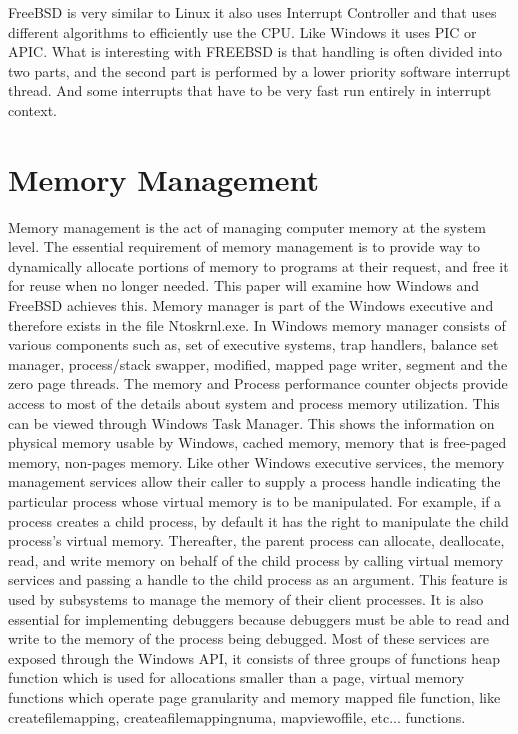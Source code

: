 \documentclass[letterpaper,10pt,draftclsnofoot,onecolumn]{IEEEtran}
\begin{document}
FreeBSD is very similar to Linux it also uses Interrupt Controller and that uses different algorithms to efficiently use the CPU. Like Windows it uses PIC or APIC. What is interesting with FREEBSD is that handling is often divided into two parts, and the second part is performed by a lower priority software interrupt thread. And some interrupts that have to be very fast run entirely in interrupt context.
\section*{Memory Management}
Memory management is the act of managing computer memory at the system level. The essential requirement of memory management is to provide way to dynamically allocate portions of memory to programs at their request, and free it for reuse when no longer needed. This paper will examine how Windows and FreeBSD achieves this. 
Memory manager is part of the Windows executive and therefore exists in the file Ntoskrnl.exe. In Windows memory manager consists of various components such as, set of executive systems, trap handlers, balance set manager, process/stack swapper, modified, mapped page writer,
segment and the zero page threads.\cite{[1]}
The memory and Process performance counter objects provide access to most of the details about system and process memory utilization. This can be viewed through Windows Task Manager. This shows the information on physical memory usable by Windows, cached memory, memory that is free-paged memory, non-pages memory.
Like other Windows executive services, the memory management services allow their caller to
supply a process handle indicating the particular process whose virtual memory is to be manipulated. For example, if a process creates a child process, by default it has the right to manipulate the child process’s virtual memory. Thereafter, the parent process can allocate, deallocate, read, and write memory on behalf of the child process by calling virtual memory services and passing a handle to the child process as an argument. This feature is used by subsystems to manage the memory of their client processes. It is also essential for implementing debuggers because debuggers must be able to read and write to the memory of the process being debugged.
Most of these services are exposed through the Windows API, it consists of three groups of functions heap function which is used for allocations smaller than a page, virtual memory functions which operate page granularity and memory mapped file function, like createfilemapping, createafilemappingnuma, mapviewoffile, etc... functions.
\end{document}

